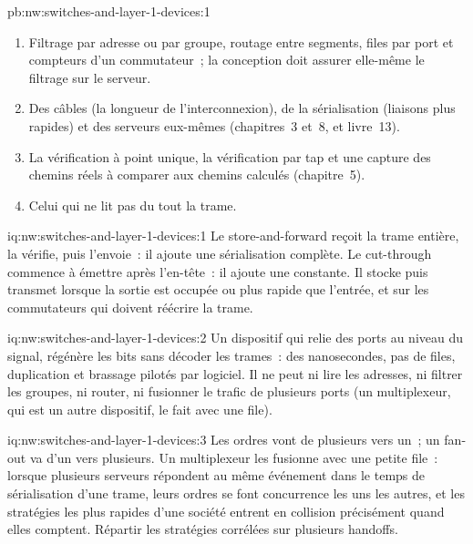 \begin{solution}{pb:nw:switches-and-layer-1-devices:1}
\begin{enumerate}
\item Filtrage par adresse ou par groupe, routage entre segments, files par port et compteurs d'un commutateur~; la conception doit assurer elle-même le filtrage sur le serveur.
  \\
\item Des câbles (la longueur de l'interconnexion), de la sérialisation (liaisons plus rapides) et des serveurs eux-mêmes (chapitres~3
  et~8, et livre~13).
\item La vérification à point unique, la vérification par tap et une capture des chemins réels à comparer aux chemins calculés (chapitre~5).
\item Celui qui ne lit pas du tout la trame.
\end{enumerate}
\end{solution}

\begin{solution}{iq:nw:switches-and-layer-1-devices:1}
Le store-and-forward reçoit la trame entière, la vérifie, puis l'envoie~: il ajoute une sérialisation complète. Le cut-through commence à émettre
après l'en-tête~: il ajoute une constante. Il stocke puis transmet lorsque la sortie est occupée ou plus rapide que l'entrée, et sur les commutateurs
qui doivent réécrire la trame.
\end{solution}

\begin{solution}{iq:nw:switches-and-layer-1-devices:2}
Un dispositif qui relie des ports au niveau du signal, régénère les bits sans décoder les trames~: des nanosecondes, pas de files, duplication et brassage
pilotés par logiciel. Il ne peut ni lire les adresses, ni filtrer les groupes, ni router, ni fusionner le trafic de plusieurs ports (un
multiplexeur, qui est un autre dispositif, le fait avec une file).
\end{solution}

\begin{solution}{iq:nw:switches-and-layer-1-devices:3}
Les ordres vont de plusieurs vers un~; un fan-out va d'un vers plusieurs. Un multiplexeur les fusionne avec une petite file~: lorsque plusieurs serveurs répondent au même
événement dans le temps de sérialisation d'une trame, leurs ordres se font concurrence les uns les autres, et les stratégies les plus rapides d'une société entrent en
collision précisément quand elles comptent. Répartir les stratégies corrélées sur plusieurs handoffs.
\end{solution}

